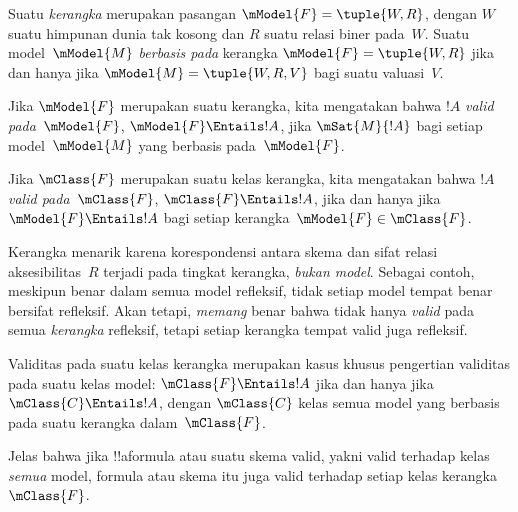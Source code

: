 \documentclass[../../../include/open-logic-section]{subfiles}
\begin{document}


\begin{defn}
  Suatu \emph{kerangka} merupakan pasangan $\mModel{F}=\tuple{W,R}$, dengan
  $W$ suatu himpunan dunia tak kosong dan $R$ suatu relasi biner pada~$W$.
  Suatu model~$\mModel{M}$ \emph{berbasis pada} kerangka
  $\mModel{F}=\tuple{W,R}$ jika dan hanya jika
  $\mModel{M}=\tuple{W,R,V}$ bagi suatu valuasi~$V$.
\end{defn}

\begin{defn}
  Jika $\mModel{F}$ merupakan suatu kerangka, kita mengatakan bahwa $!A$
  \emph{valid pada~$\mModel{F}$}, $\mModel{F}\Entails !A$, jika
  $\mSat{M}{!A}$ bagi setiap model~$\mModel{M}$ yang berbasis
  pada~$\mModel{F}$.

  Jika $\mClass{F}$ merupakan suatu kelas kerangka, kita mengatakan bahwa
  $!A$ \emph{valid pada~$\mClass{F}$}, $\mClass{F}\Entails !A$, jika dan
  hanya jika $\mModel{F}\Entails !A$ bagi setiap
  kerangka~$\mModel{F}\in\mClass{F}$.
\end{defn}

Kerangka menarik karena korespondensi antara skema dan sifat relasi
aksesibilitas~$R$ terjadi pada tingkat kerangka, \emph{bukan model}. Sebagai
contoh, meskipun  benar dalam semua model refleksif, tidak setiap model
tempat  benar bersifat refleksif. Akan tetapi, \emph{memang} benar bahwa
 tidak hanya \emph{valid} pada semua \emph{kerangka} refleksif, tetapi
setiap kerangka tempat  valid juga refleksif.

\begin{rem}
Validitas pada suatu kelas kerangka merupakan kasus khusus pengertian validitas
pada suatu kelas model: $\mClass{F}\Entails !A$ jika dan hanya jika
$\mClass{C}\Entails !A$, dengan $\mClass{C}$ kelas semua model yang berbasis
pada suatu kerangka dalam~$\mClass{F}$.

Jelas bahwa jika !!a{formula} atau suatu skema valid, yakni valid terhadap
kelas \emph{semua} model, formula atau skema itu juga valid terhadap setiap
kelas kerangka~$\mClass{F}$.
\end{rem}
\end{document}
